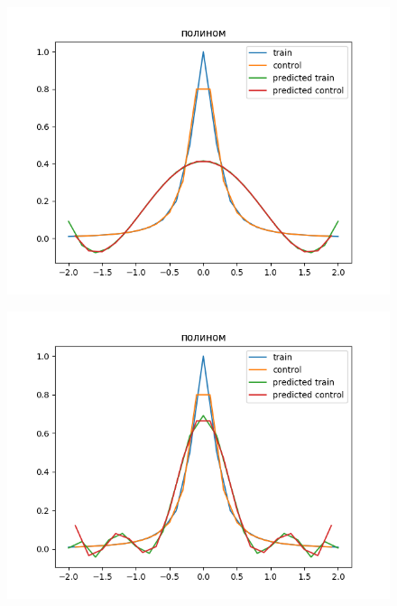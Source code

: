 \documentclass[12pt]{report}
\begin{document}
\begin{figure}[H!]
  \centering
  \includegraphics[width = \linewidth]{5.png}
  \caption{}
  \label{fig:5}
\end{figure}

\begin{figure}[H!]
  \centering
  \includegraphics[width = \linewidth]{10.png}
  \caption{}
  \label{fig:10}
\end{figure}
\end{document}
